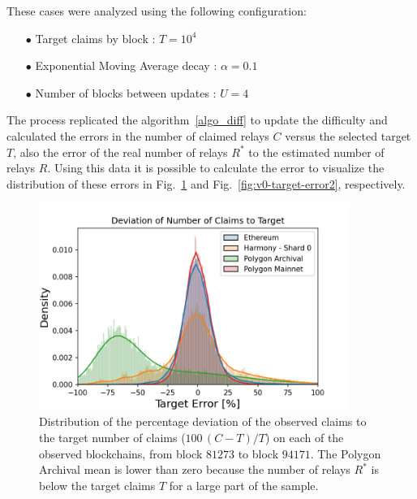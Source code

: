 \documentclass[runningheads]{llncs}
\begin{document}
These cases were analyzed using the following configuration:
\begin{itemize}
    \item[$\bullet$] Target claims by block : $T = 10^4$
    \item[$\bullet$] Exponential Moving Average decay : $\alpha = 0.1$
    \item[$\bullet$] Number of blocks between updates : $U = 4$
\end{itemize}

The process replicated the algorithm~\ref{algo_diff} to update the difficulty and calculated the errors in the number of claimed relays $C$ versus the selected target $T$, also the error of the real number of relays $R^*$ to the estimated number of relays $R$. Using this data it is possible to calculate the error to visualize the distribution of these errors in Fig.~\ref{fig:v0-target-error1} and Fig.~\ref{fig:v0-target-error2}, respectively.

\begin{figure}
    \includegraphics[width=0.9\textwidth]{v0_all_error_target.png}
    \caption{Distribution of the percentage deviation of the observed claims to the target number of claims ($100\, (C-T)/T$) on each of the observed blockchains, from block $81273$  to block $94171$. The Polygon Archival mean is lower than zero because the number of relays $R^*$ is below the target claims $T$ for a large part of the sample.} \label{fig:v0-target-error1}
\end{figure}
\end{document}
